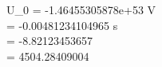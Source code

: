 U_0 = -1.46455305878e+53 V\\ \tau = -0.00481234104965 \si{\second}\\ \varphi = -8.82123453657\\ \omega = 4504.28409004